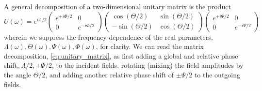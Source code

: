 A general decomposition of a two-dimensional unitary matrix is the product~\cite[p.~95]{Leonhardt2010}
\begin{equation}
	U(\omega)
	=
	e^{i\Lambda/2}
	\begin{pmatrix}
		e^{+i\Phi/2} & 0 \\
		0 & e^{-i\Phi/2}
	\end{pmatrix}
	\begin{pmatrix}
		\cos(\Theta/2) & \sin(\Theta/2) \\
		-\sin(\Theta/2) & \cos(\Theta/2)
	\end{pmatrix}
	\begin{pmatrix}
		e^{+i\Psi/2} & 0 \\
		0 & e^{-i\Psi/2}
	\end{pmatrix}
	\label{eq:unitary_matrix}
\end{equation}
wherein we suppress the frequency-dependence of the real parameters, $\Lambda(\omega),\Theta(\omega),\Psi(\omega),\Phi(\omega)$, for clarity.
We can read the matrix decomposition, \cref{eq:unitary_matrix}, as first adding a global and relative phase shift, $\Lambda/2,\pm\Psi/2$, to the incident fields, rotating (mixing) the field amplitudes by the angle $\Theta/2$, and adding another relative phase shift of $\pm\Psi/2$ to the outgoing fields.

